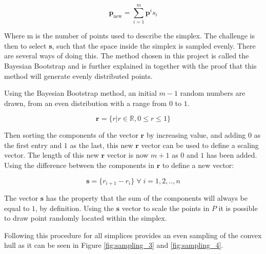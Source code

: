 \begin{equation}
\mathbf{p}_{\text{new}} = \sum_{i=1}^m \mathbf{p}^i s_i
\end{equation}

Where m is the number of points used to describe the simplex. The challenge is then to select $\mathbf{s}$, such that the space inside the simplex is sampled evenly. There are several ways of doing this. The method chosen in this project is called the Bayesian Bootstrap and is further explained in \cite{Bayesian_Bootstrap} together with the proof that this method will generate evenly distributed points. 

Using the Bayesian Bootstrap method, an initial $m-1$ random numbers are drawn, from an even distribution with a range from $0$ to $1$. 

\begin{equation}
\mathbf{r} = \{r | r \in \mathbb{R} , 0\leq r\leq 1 \}
\end{equation}

Then sorting the components of the vector $\mathbf{r}$ by increasing value, and adding $0$ as the first entry and  $1$ as the last, this new $\mathbf{r}$ vector can be used to define a scaling vector. The length of this new $\mathbf{r}$ vector is now $m+1$ as $0$ and $1$ has been added. Using the difference between the components in $\mathbf{r}$ to define a new vector: 

\begin{equation}
\mathbf{s} = \{r_{i+1} - r_i \} \; \forall \; i=1,2,..,n
\end{equation}

The vector $\mathbf{s}$ has the property that the sum of the components will always be equal to $1$, by definition. Using the $\mathbf{s}$ vector to scale the points in $P$ it is possible to draw point randomly located within the simplex.

Following this procedure for all simplices provides an even sampling of the convex hull as it can be seen in Figure \ref{fig:sampling_3} and \ref{fig:sampling_4}.

